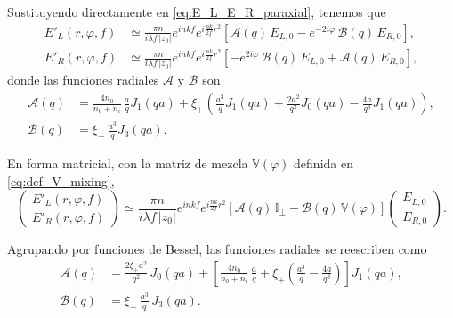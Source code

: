 Sustituyendo directamente en \eqref{eq:E_L_E_R_paraxial}, tenemos que
\begin{equation}
  \begin{aligned}
    E'_L(r,\varphi,f)
    &\simeq
    \frac{\pi n}{i\lambda f\,|z_0|}
    e^{inkf}
    e^{i\frac{nk}{2f}r^2}
    \left[
      \mathcal A(q)\,E_{L,0}
      -
      e^{-2i\varphi}\,\mathcal B(q)\,E_{R,0}
    \right],
    \\[0.5em]
    E'_R(r,\varphi,f)
    &\simeq
    \frac{\pi n}{i\lambda f\,|z_0|}
    e^{inkf}
    e^{i\frac{nk}{2f}r^2}
    \left[
      -
      e^{2i\varphi}\,\mathcal B(q)\,E_{L,0}
      +
      \mathcal A(q)\,E_{R,0}
    \right],
  \end{aligned}
  \label{eq:EL_ER_constant_E0}
\end{equation}
donde las funciones radiales $\mathcal A$ y $\mathcal B$ son
\begin{equation}
  \begin{aligned}
    \mathcal A(q)
    &=
    \frac{4n_0}{n_0+n_i}\,
    \frac{a}{q}J_1(qa)
    +
    \xi_+
    \left(
      \frac{a^3}{q}J_1(qa)
      +
      \frac{2a^2}{q^2}J_0(qa)
      -
      \frac{4a}{q^3}J_1(qa)
    \right),
    \\[0.5em]
    \mathcal B(q)
    &=
    \xi_-\,
    \frac{a^3}{q}J_3(qa).
  \end{aligned}
  \label{eq:A_B_circular_def}
\end{equation}

En forma matricial, con la matriz de mezcla $\mathbb V(\varphi)$ definida en \eqref{eq:def_V_mixing},
\begin{equation}
  \begin{pmatrix}
    E'_L(r,\varphi,f) \\
    E'_R(r,\varphi,f)
  \end{pmatrix}
  \simeq
  \frac{\pi n}{i\lambda f\,|z_0|}
  e^{inkf}
  e^{i\frac{nk}{2f}r^2}
  \left[
    \mathcal A(q)\,\mathbb I_\perp
    -
    \mathcal B(q)\,\mathbb V(\varphi)
  \right]
  \begin{pmatrix}
    E_{L,0} \\
    E_{R,0}
  \end{pmatrix}.
  \label{eq:EL_ER_constant_E0_matrix}
\end{equation}

Agrupando por funciones de Bessel, las funciones radiales se reescriben como
\begin{equation}
  \begin{aligned}
    \mathcal A(q)
    &=
    \frac{2\xi_+ a^2}{q^2}\,J_0(qa)
    +
    \left[
      \frac{4n_0}{n_0+n_i}\,\frac{a}{q}
      +
      \xi_+
      \left(
        \frac{a^3}{q}
        -
        \frac{4a}{q^3}
      \right)
    \right] J_1(qa),
    \\[0.5em]
    \mathcal B(q)
    &=
    \xi_-\,\frac{a^3}{q}\,J_3(qa).
  \end{aligned}
  \label{eq:EL_ER_constant_E0_bessel_series}
\end{equation}

